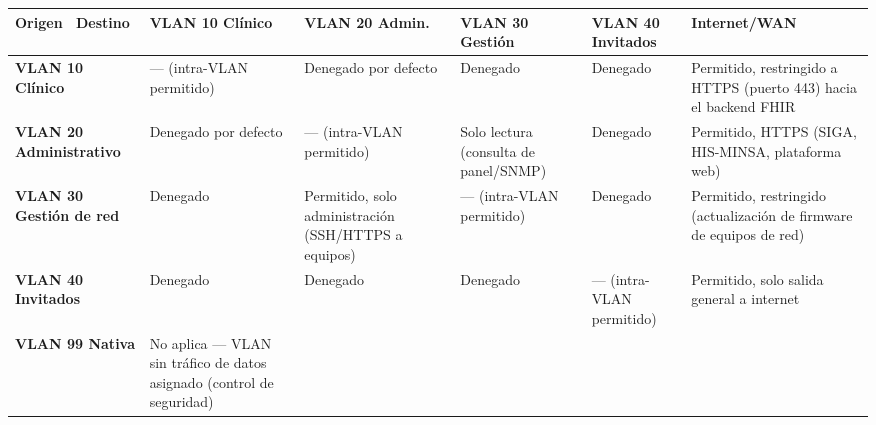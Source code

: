 \documentclass[11pt,a4paper]{article}
\begin{document}
{\small
\begin{longtable}[]{@{}
  >{\raggedright\arraybackslash}p{}
  >{\raggedright\arraybackslash}p{}
  >{\raggedright\arraybackslash}p{}
  >{\raggedright\arraybackslash}p{}
  >{\raggedright\arraybackslash}p{}
  >{\raggedright\arraybackslash}p{}@{}}
\toprule\noalign{}
\begin{minipage}[b]{\linewidth}\raggedright
Origen ~Destino
\end{minipage} & \begin{minipage}[b]{\linewidth}\raggedright
VLAN 10 Clínico
\end{minipage} & \begin{minipage}[b]{\linewidth}\raggedright
VLAN 20 Admin.
\end{minipage} & \begin{minipage}[b]{\linewidth}\raggedright
VLAN 30 Gestión
\end{minipage} & \begin{minipage}[b]{\linewidth}\raggedright
VLAN 40 Invitados
\end{minipage} & \begin{minipage}[b]{\linewidth}\raggedright
Internet/WAN
\end{minipage} \\
\midrule\noalign{}
\endhead
\bottomrule\noalign{}
\endlastfoot
\textbf{VLAN 10 Clínico} & --- (intra-VLAN permitido) & Denegado por defecto & Denegado & Denegado & Permitido, restringido a HTTPS (puerto 443) hacia el backend FHIR \\
\textbf{VLAN 20 Administrativo} & Denegado por defecto & --- (intra-VLAN permitido) & Solo lectura (consulta de panel/SNMP) & Denegado & Permitido, HTTPS (SIGA, HIS-MINSA, plataforma web) \\
\textbf{VLAN 30 Gestión de red} & Denegado & Permitido, solo administración (SSH/HTTPS a equipos) & --- (intra-VLAN permitido) & Denegado & Permitido, restringido (actualización de firmware de equipos de red) \\
\textbf{VLAN 40 Invitados} & Denegado & Denegado & Denegado & --- (intra-VLAN permitido) & Permitido, solo salida general a internet \\
\textbf{VLAN 99 Nativa} & No aplica --- VLAN sin tráfico de datos asignado (control de seguridad) & & & & \\
\end{longtable}
}
\end{document}
